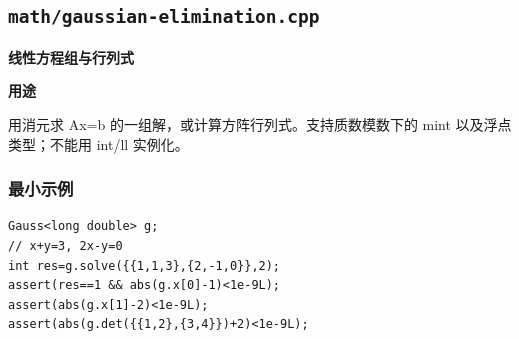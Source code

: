 \documentclass[UTF8,a4paper,10pt]{ctexart}
\newcommand{\TemplUsage}[1]{\textbf{用途}\par #1\par}
\begin{document}
\subsection{\texttt{math/gaussian-elimination.cpp}}
\textbf{线性方程组与行列式}\par
\TemplUsage{用消元求 Ax=b 的一组解，或计算方阵行列式。支持质数模数下的 mint 以及浮点类型；不能用 int/ll 实例化。}
\subsubsection*{最小示例}
\begin{lstlisting}
Gauss<long double> g;
// x+y=3, 2x-y=0
int res=g.solve({{1,1,3},{2,-1,0}},2);
assert(res==1 && abs(g.x[0]-1)<1e-9L);
assert(abs(g.x[1]-2)<1e-9L);
assert(abs(g.det({{1,2},{3,4}})+2)<1e-9L);
\end{lstlisting}
\end{document}
